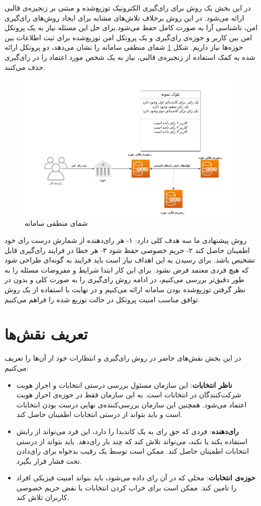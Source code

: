 در این بخش یک روش برای رای‌گیری الکترونیک توزیع‌شده و مبتنی بر زنجیره‌ی قالبی ارائه می‌شود. در این روش برخلاف تلاش‌های مشابه برای ایجاد روش‌های رای‌گیری امن، ناشناسی آرا به صورت کامل حفظ می‌شود.برای حل این مسئله نیاز به یک پروتکل امن بین کاربر و حوزه‌ی رای‌گیری و یک پروتکل امن توزیع‌شده برای ثبت اطلاعات بین حوزه‌ها نیاز داریم. شکل \ref{fig:toplevel} شمای منطقی سامانه را نشان می‌دهد، دو پروتکل ارائه شده به کمک استفاده از زنجیره‌ی قالبی، نیاز به یک شخص مورد اعتماد را در رای‌گیری حذف می‌کنند.
\begin{figure}[h!]
	\centering
	\includegraphics[width=1\linewidth]{toplevel.png}
	\caption {شمای منطقی سامانه}
	\label{fig:toplevel}
\end{figure}


\par
روش پیشنهادی ما سه هدف کلی دارد: ۱- هر رای‌دهنده از شمارش درست رای خود اطمینان حاصل کند ۲- حریم خصوصی حفظ شود ۳- هر خطا در فرایند رای‌گیری قابل تشخیص باشد. برای رسیدن به این اهداف نیاز است باید فرایند به گونه‌ای طراحی شود که هیچ فردی معتمد فرض نشود. برای این کار ابتدا شرایط و مفروضات مسئله را به طور دقیق‌تر بررسی می‌کنیم، در ادامه روش رای‌گیری را به صورت کلی و بدون در نظر گرفتن توزیع‌شده بودن سامانه ارائه می‌کنیم و در نهایت با استفاده از یک روش توافق مناسب امنیت پروتکل در حالت توزیع شده را فراهم می‌کنیم. 
\section{تعریف نقش‌ها}
در این بخش نقش‌های حاضر در روش رای‌گیری و انتظارات خود از آن‌ها را تعریف می‌کنیم:
\begin{itemize}
	\item
	\textbf{ناظر انتخابات}:
	این سازمان مسئول بررسی درستی انتخابات و احراز هویت شرکت‌کنندگان در انتخابات است. به این سازمان فقط در حوزه‌ی احراز هویت اعتماد می‌شود. همچنین این سازمان بررسی‌کننده‌ی نهایی درست بودن انتخابات است و باید بتواند از درستی انتخابات اطمینان حاصل کند.
	\item
	\textbf{رای‌دهنده}:
	فردی که حق رای به یک کاندیدا را دارد، این فرد می‌تواند از رایش استفاده بکند یا نکند، می‌تواند تلاش کند که چند بار رای‌دهد. باید بتواند از درستی انتخابات اطمینان حاصل کند. ممکن است توسط یک رقیب بدخواه برای رای‌دادن تحت فشار قرار بگیرد.
	\item
	\textbf{حوزه‌ی انتخابات}:
	محلی که در آن رای داده می‌شود، باید بتواند امنیت فیزیکی افراد را تامین کند. ممکن است برای خراب کردن انتخابات یا نقض حریم خصوصی کاربران تلاش کند. 
\end{itemize}
